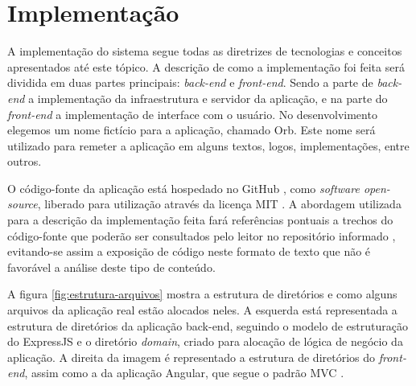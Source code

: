 \chapter{Implementação}
A implementação do sistema segue todas as diretrizes de tecnologias e conceitos apresentados até este tópico. A descrição de como a implementação foi feita será dividida em duas partes principais: \textit{back-end} e \textit{front-end}. Sendo a parte de \textit{back-end} a implementação da infraestrutura e servidor da aplicação, e na parte do \textit{front-end} a implementação de interface com o usuário. No desenvolvimento elegemos um nome fictício para a aplicação, chamado Orb. Este nome será utilizado para remeter a aplicação em alguns textos, logos, implementações, entre outros.

O código-fonte da aplicação está hospedado no GitHub \cite{orb}, como \textit{software open-source}, liberado para utilização através da licença MIT \cite{mit}. A abordagem utilizada para a descrição da implementação feita fará referências pontuais a trechos do código-fonte que poderão ser consultados pelo leitor no repositório informado \cite{orb}, evitando-se assim a exposição de código neste formato de texto que não é favorável a análise deste tipo de conteúdo.

A figura \ref{fig:estrutura-arquivos} mostra a estrutura de diretórios e como alguns arquivos da aplicação real estão alocados neles. A esquerda está representada a estrutura de diretórios da aplicação back-end, seguindo o modelo de estruturação do ExpressJS e o diretório \textit{domain}, criado para alocação de lógica de negócio da aplicação. A direita da imagem é representado a estrutura de diretórios do \textit{front-end}, assim como a da aplicação Angular, que segue o padrão MVC \cite{mvc-mvw}.

